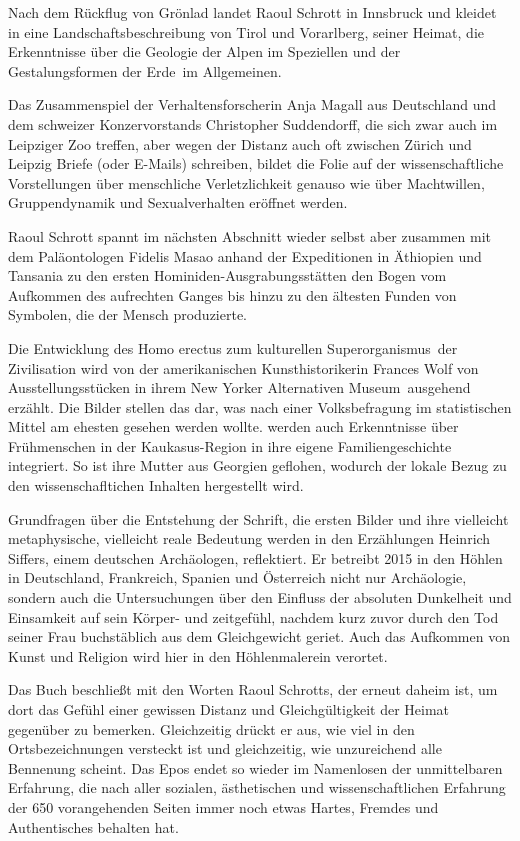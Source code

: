 Nach dem Rückflug von Grönlad landet Raoul Schrott in Innsbruck und kleidet in
  eine Landschaftsbeschreibung von Tirol und Vorarlberg, seiner Heimat, die
  Erkenntnisse über die Geologie der Alpen im Speziellen und der \glqq
  Gestalungsformen der Erde\grqq\ im Allgemeinen.

Das Zusammenspiel der Verhaltensforscherin Anja Magall aus Deutschland und dem
  schweizer Konzervorstands Christopher Suddendorff, die sich zwar auch im
  Leipziger Zoo treffen, aber wegen der Distanz auch oft zwischen Zürich und Leipzig Briefe
  (oder E-Mails) schreiben, bildet die Folie auf der wissenschaftliche
  Vorstellungen über menschliche Verletzlichkeit genauso wie über Machtwillen,
  Gruppendynamik und Sexualverhalten eröffnet werden.

Raoul Schrott spannt im nächsten Abschnitt wieder selbst aber zusammen mit dem
  Paläontologen Fidelis Masao anhand der Expeditionen in Äthiopien und
  Tansania zu den ersten Hominiden-Ausgrabungsstätten den Bogen vom Aufkommen
  des aufrechten Ganges bis hinzu zu den ältesten Funden von Symbolen, die der
  Mensch produzierte.

Die Entwicklung des Homo erectus zum kulturellen \glqq Superorganismus\grqq\
  der Zivilisation wird von der amerikanischen Kunsthistorikerin Frances Wolf
  von Ausstellungsstücken in ihrem New Yorker \glqq Alternativen Museum\grqq\
  ausgehend erzählt.
Die Bilder stellen das dar, was nach einer Volksbefragung im statistischen
  Mittel am ehesten gesehen werden wollte.
\Ua werden auch Erkenntnisse über Frühmenschen in der Kaukasus-Region in ihre
  eigene Familiengeschichte integriert. So ist \zB ihre Mutter aus Georgien
  geflohen, wodurch der lokale Bezug zu den wissenschafltichen Inhalten
  hergestellt wird.

Grundfragen über die Entstehung der Schrift, die ersten Bilder und ihre
  vielleicht metaphysische, vielleicht reale Bedeutung werden in den
  Erzählungen Heinrich Siffers, einem deutschen Archäologen, reflektiert.
Er betreibt 2015 in den Höhlen in Deutschland, Frankreich, Spanien und Österreich
  nicht nur Archäologie, sondern auch die Untersuchungen über den Einfluss der
  absoluten Dunkelheit und Einsamkeit auf sein Körper- und zeitgefühl, nachdem
  kurz zuvor durch den Tod seiner Frau buchstäblich aus dem Gleichgewicht
  geriet.
Auch das Aufkommen von Kunst und Religion wird hier in den Höhlenmalerein verortet.

Das Buch beschließt mit den Worten Raoul Schrotts, der erneut daheim ist, um
  dort das Gefühl einer gewissen Distanz und Gleichgültigkeit der Heimat
  gegenüber zu bemerken.
Gleichzeitig drückt er aus, wie viel \zB in den Ortsbezeichnungen versteckt
  ist und gleichzeitig, wie unzureichend alle Bennenung scheint.
Das Epos endet so wieder im Namenlosen der unmittelbaren Erfahrung, die nach
  aller sozialen, ästhetischen und wissenschaftlichen Erfahrung der 650
  vorangehenden Seiten immer noch etwas Hartes, Fremdes und Authentisches
  behalten hat.
